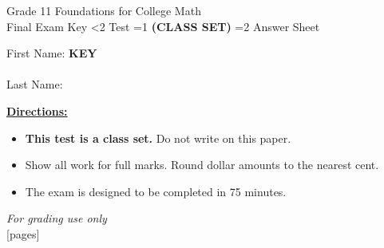 \documentclass[addpoints]{exam}
\newcommand{\event}{Final Exam}
\newcommand{\tournament}{}
\def\type{0}
\begin{document}
\begin{center}
    {\huge Grade 11 Foundations for College Math \\ \event
    \ifprintanswers \space Key
    \else \space \ifnum\type<2 Test \fi \ifnum\type=1 \textbf{(CLASS SET)} \fi
          \ifnum\type=2 Answer Sheet \fi
    \fi \\ \vspace{3mm}\tournament\vspace{1mm}}
\end{center}

\vspace{.25\textheight}

\begin{center}
    First Name: \ifprintanswers
    \underline{\hspace{3.5cm}}\textbf{KEY}\underline{\hspace{5.5cm}}\\\vspace{5mm}
    \else \underline{\hspace{10cm}}\\ \vspace{5mm} \fi
    Last Name: \underline{\hspace{10cm}}\\ \vspace{5mm}
\end{center}

\noindent\textbf{\underline{Directions:}}
\begin{itemize}
    \ifnum\type=1 \item \textbf{This test is a class set.} Do not write on this paper. \fi
    \item Show all work for full marks. Round dollar amounts to the nearest cent.
    \item The exam is designed to be completed in 75 minutes.
\end{itemize}
\begin{center}
\textit{For grading use only}\\
[pages]
\end{center}
\end{document}
